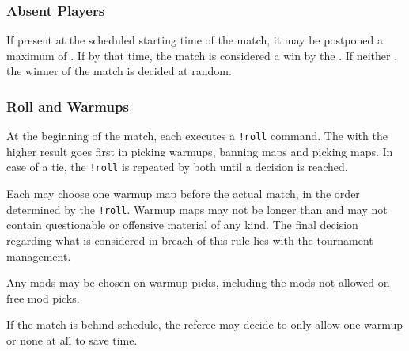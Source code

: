 \subsubsection{Absent Players}
If  present at the scheduled starting time of the match, it may be postponed a maximum of \maxlate.
If  by that time, the match is considered a win by the .
If neither , the winner of the match is decided at random.

\subsubsection{Roll and Warmups}
\label{sec:warmup}
At the beginning of the match, each  executes a \texttt{!roll} command. The  with the higher result goes first in picking warmups, banning maps and picking maps. In case of a tie, the \texttt{!roll} is repeated by both  until a decision is reached.

Each  may choose one warmup map before the actual match, in the order determined by the \texttt{!roll}.  Warmup maps may not be longer than \maxwarmup{} and may not contain questionable or offensive material of any kind. The final decision regarding what is considered in breach of this rule lies with the tournament management.

Any mods may be chosen on warmup picks, including the mods not allowed on free mod picks.

If the match is behind schedule, the referee may decide to only allow one warmup or none at all to save time.


